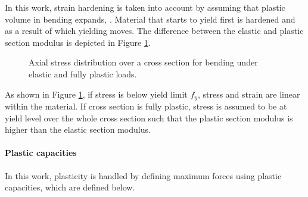 \documentclass{jcgt}
\begin{document}
In this work, strain hardening is taken into account by assuming that plastic volume in bending
expands, 
\cite{dowling}.
Material that starts to yield first is hardened and as a result of which yielding moves.
%
The difference between the elastic and plastic section modulus is depicted in Figure \ref{fig:wp}.

\begin{figure}[htb!]
\centering
{}
\hspace{1cm}
\caption{Axial stress distribution over a cross section for bending under elastic and fully plastic loads.}
\label{fig:wp}
\end{figure}

As shown in Figure \ref{fig:wp}, if stress is below yield limit $f_y$, stress and strain are linear within the material.
If cross section is fully plastic, stress is assumed to be at yield level over the whole cross section such that 
the plastic section modulus is higher than the elastic section modulus.

\paragraph{Plastic capacities}
In this work, plasticity is handled by defining maximum forces using plastic capacities, which are defined below.
\end{document}
